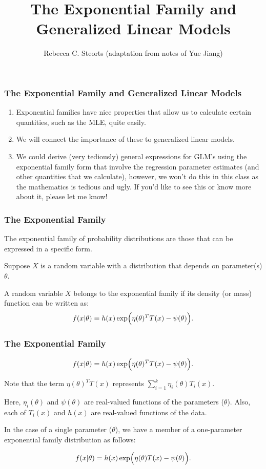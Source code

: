 \documentclass{beamer}
\title{The Exponential Family and \\ Generalized Linear Models}
\author{Rebecca C. Steorts (adaptation from notes of Yue Jiang)}
\begin{document}
\begin{frame}
  \titlepage
\end{frame}





\begin{frame}
\frametitle{The Exponential Family and Generalized Linear Models}

\begin{enumerate}
\item Exponential families have nice properties that allow us to calculate certain quantities, such as the MLE, quite easily. 
\item We will connect the importance of these to generalized linear models. 
\item We could derive (very tediously) general expressions for GLM's using the exponential family form that involve the regression parameter estimates (and other quantities that we calculate), however, we won't do this in this class as the mathematics is tedious and ugly. If you'd like to see this or know more about it, please let me know! 
\end{enumerate}



\end{frame}

\begin{frame}
\frametitle{The Exponential Family}
The exponential family of probability distributions are those that
can be expressed in a specific form.

\vspace*{1em}
Suppose $X$ is a random variable with a distribution that depends on parameter(s) $\theta$. 

\vspace*{1em}
A random variable $X$ belongs to the exponential family if its density (or mass) function can be written as:
\[
f(x|\theta) = h(x)\exp\Bigl(\eta(\theta)^T T(x) - \psi(\theta)\Bigr).
\]


\end{frame}




\begin{frame}
\frametitle{The Exponential Family}

\[
f(x|\theta) = h(x)\exp\Bigl(\eta(\theta)^T T(x) - \psi(\theta)\Bigr).
\]

Note that the term $\eta(\theta)^T T(x)$ represents 
$
  \sum_{i=1}^k \eta_i(\theta) T_i(x).
$
\vspace*{1em}

Here, $\eta_i(\theta)$ and $\psi(\theta)$ are real-valued functions of the parameters ($\theta$). 
Also, each of $T_i(x)$ and $h(x)$ are real-valued functions of the data.

\vspace*{1em}

In the case of a single parameter ($\theta$), we have a member of a one-parameter exponential family distribution as follows:

\[
f(x|\theta) = h(x)\exp\Bigl(\eta(\theta) T(x) - \psi(\theta)\Bigr).
\]
\end{frame}
\end{document}
